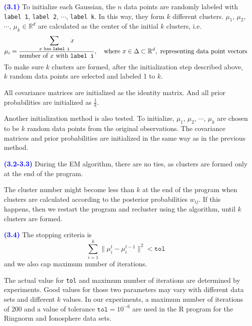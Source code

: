 \documentclass[a4paper,12pt]{article}
\newcommand{\code}[1]{\texttt{#1}}
\newcommand{\qnum}[1]{\noindent\textcolor{blue}{\textbf{(#1)}}}
\begin{document}
\qnum{3.1}
To initialize each Gaussian, the $n$ data points are randomly labeled with \code{label 1}, \code{label 2}, $\cdots$, \code{label k}. In this way, they form $k$ different clusters. $\mu_1$, $\mu_2$, $\cdots$, $\mu_{k}\in \mathbb{R}^d$ are calculated as the center of the initial $k$ clusters, i.e.
\[
    \mu_i 
    = \frac{\displaystyle\sum_{x\text{ has \code{label i}}} x}{\text{number of $x$ with \code{label i}}},\quad 
    \text{where } x\in \Delta\subset \mathbb{R}^d, \text{ representing data point vectors}
\]
To make sure $k$ clusters are formed, after the initialization step described above, $k$ random data points are selected and labeled 1 to $k$.

All covariance matrices are initialized as the identity matrix. And all prior probabilities are initialized as $\frac{1}{k}$.
\bigskip

Another initialization method is also tested. To initialize, $\mu_1$, $\mu_2$, $\cdots$, $\mu_{k}$ are chosen to be $k$ random data points from the original observations. The covariance matrices and prior probabilities are initialized in the same way as in the previous method.
\bigskip



\qnum{3.2-3.3}
During the EM algorithm, there are no ties, as clusters are formed only at the end of the program. 

The cluster number might become less than $k$ at the end of the program when clusters are calculated according to the posterior probabilities $w_{ij}$. If this happens, then we restart the program and recluster using the algorithm, until $k$ clusters are formed.
\bigskip




\qnum{3.4}
The stopping criteria is 
\[
    \sum_{i = 1}^k \|\mu_i^t-\mu_i^{t-1}\|^2 < \code{tol}
\]
and we also cap maximum number of iterations.

The actual value for \code{tol} and maximum number of iterations are determined by experiments. Good values for those two parameters may vary with different data sets and different $k$ values. In our experiments, a maximum number of iterations of 200 and a value of tolerance $\code{tol} = 10^{-6}$ are used in the R program for the Ringnorm and Ionosphere data sets.
\end{document}
